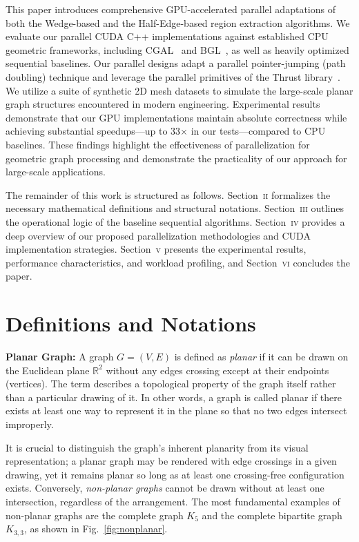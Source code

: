 \documentclass[conference]{IEEEtran}
\begin{document}
This paper introduces comprehensive GPU-accelerated parallel adaptations of both the Wedge-based and the Half-Edge-based region extraction algorithms. We evaluate our parallel CUDA C++ implementations against established CPU geometric frameworks, including CGAL~\cite{10.1145/1653771.1653865} and BGL~\cite{10.5555/504206}, as well as heavily optimized sequential baselines. Our parallel designs adapt a parallel pointer-jumping (path doubling) technique and leverage the parallel primitives of the Thrust library~\cite{BELL2012359}. We utilize a suite of synthetic 2D mesh datasets to simulate the large-scale planar graph structures encountered in modern engineering. Experimental results demonstrate that our GPU implementations maintain absolute correctness while achieving substantial speedups—up to 33$\times$ in our tests—compared to CPU baselines. These findings highlight the effectiveness of parallelization for geometric graph processing and demonstrate the practicality of our approach for large-scale applications.

The remainder of this work is structured as follows. Section~\textsc{ii} formalizes the necessary mathematical definitions and structural notations. Section~\textsc{iii} outlines the operational logic of the baseline sequential algorithms. Section~\textsc{iv} provides a deep overview of our proposed parallelization methodologies and CUDA implementation strategies. Section~\textsc{v} presents the experimental results, performance characteristics, and workload profiling, and Section~\textsc{vi} concludes the paper.




\section{Definitions and Notations}


\textbf{Planar Graph:} A graph $G = (V, E)$ is defined as \textit{planar} if it can be drawn on the Euclidean plane $\mathbb{R}^2$ without any edges crossing except at their endpoints (vertices). The term describes a topological property of the graph itself rather than a particular drawing of it. In other words, a graph is called planar if there exists at least one way to represent it in the plane so that no two edges intersect improperly.

It is crucial to distinguish the graph's inherent planarity from its visual representation; a planar graph may be rendered with edge crossings in a given drawing, yet it remains planar so long as at least one crossing-free configuration exists. Conversely, \textit{non-planar graphs} cannot be drawn without at least one intersection, regardless of the arrangement. The most fundamental examples of non-planar graphs are the complete graph $K_5$ and the complete bipartite graph $K_{3,3}$, as shown in Fig.~\ref{fig:nonplanar}.
\end{document}
